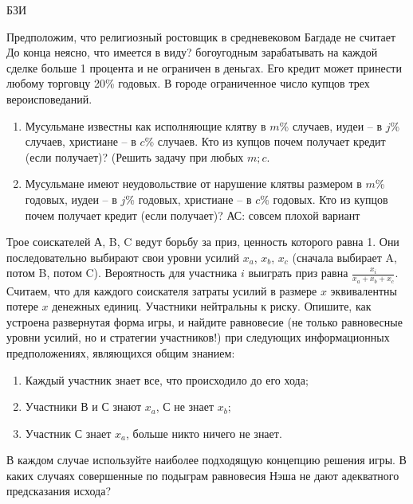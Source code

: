 \begin{problem}\begin{source}
БЗИ
\end{source}
Предположим, что религиозный ростовщик в средневековом Багдаде
не считает {\red До конца неясно, что имеется в виду?} богоугодным зарабатывать на каждой сделке больше
1 процента и не ограничен в деньгах. Его кредит может
принести любому торговцу 20\% годовых. В городе
ограниченное число купцов трех вероисповеданий.

\begin{enumerate}
\item
Мусульмане
известны как исполняющие клятву в $m$\% случаев, иудеи -- в
$j$\% случаев, христиане -- в $c$\% случаев. Кто из купцов
почем получает кредит (если получает)? (Решить задачу при любых $m;c$.

\item Мусульмане имеют неудовольствие от нарушение
клятвы размером в $m$\% годовых, иудеи -- в $j$\% годовых,
христиане -- в $c$\% годовых. Кто из купцов почем получает
кредит (если получает)? {\red АС: совсем плохой вариант}
\end{enumerate}
\begin{sol}

\end{sol}
\end{problem}






\begin{problem}\begin{source}
\cite{savva:nmu}
\end{source}
 Трое соискателей А, B, C ведут борьбу за приз, ценность которого равна 1. Они последовательно выбирают свои уровни усилий $x_{a}$, $x_{b}$, $x_{c}$ (сначала выбирает A, потом B, потом C). Вероятность для участника $i$ выиграть приз равна $\frac{x_{i}}{x_{a}+x_{b}+x_{c}}$. Считаем, что для каждого соискателя затраты усилий в размере $x$ эквивалентны потере $x$ денежных единиц. Участники нейтральны к риску.
Опишите, как устроена развернутая форма игры, и найдите равновесие (не только равновесные уровни усилий, но и стратегии участников!) при следующих информационных предположениях, являющихся общим знанием:
\begin{enumerate}
\item Каждый участник знает все, что происходило до его хода;
\item Участники В и С знают $x_{a}$, С не знает $x_{b}$;
\item Участник С знает $x_{a}$, больше никто ничего не знает.
\end{enumerate}
В каждом случае используйте наиболее подходящую концепцию решения игры. В каких случаях совершенные по подыграм равновесия Нэша не дают адекватного предсказания исхода?


\begin{sol}

\end{sol}
\end{problem}





